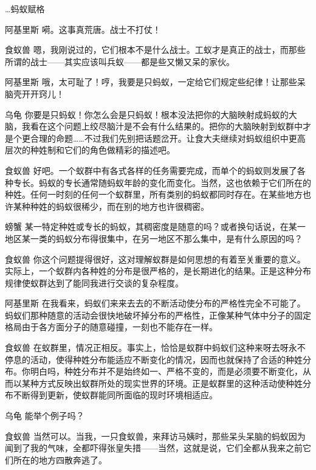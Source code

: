 \begin{dialog}{…蚂蚁赋格}
\begin{dialogue}
\item[阿基里斯]嗬。这事真荒唐。战士不打仗！

\item[食蚁兽]嗯，我刚说过的，它们根本不是什么战士。工蚁才是真正的战士，而那些所谓的战士——其实应该叫兵蚁——都是些又懒又呆的家伙。

\item[阿基里斯]哦，太可耻了！哼，我要是只蚂蚁，一定给它们规定些纪律！让那些呆脑壳开开窍儿！

\item[乌龟]你要是只蚂蚁！你怎么会是只蚂蚁！根本没法把你的大脑映射成蚂蚁的大脑，我看在这个问题上绞尽脑汁是不会有什么结果的。把你的大脑映射到蚁群中才是个更合理的命题……不过我们先别把话题岔开。让食大夫继续对蚂蚁组织中更高层次的种姓制和它们的角色做精彩的描述吧。

\item[食蚁兽]好吧。一个蚁群中有各式各样的任务需要完成，而单个的蚂蚁则发展了各种专长。蚂蚁的专长通常随蚂蚁年龄的变化而变化。当然，这也依赖于它们所在的种姓。任何一时刻的任何一个蚁群里，所有类别的蚂蚁都同时存在。在某些地方也许某种种姓的蚂蚁很稀少，而在别的地方也许很稠密。

\item[螃蟹]某一特定种姓或专长的蚂蚁，其稠密度是随意的吗？或者换句话说，在某一地区某一类的蚂蚁分布得很集中，在另一地区不那么集中，是有什么原因的吗？

\item[食蚁兽]你这个问题提得很好，这对理解蚁群是如何思想的有着至关重要的意义。实际上，一个蚁群内各种姓的分布是很严格的，是长期进化的结果。正是这种分布规律使蚁群达到了能同我进行交谈的复杂程度。

\item[阿基里斯]在我看来，蚂蚁们来来去去的不断活动使分布的严格性完全不可能了。蚂蚁们那种随意的活动会很快地破坏掉分布的严格性，正像某种气体中分子的固定格局由于各方面分子的随意碰撞，一刻也不能存在一样。

\item[食蚁兽]在蚁群里，情况正相反。事实上，恰恰是蚁群中蚂蚁们这种来呀去呀永不停息的活动，使得种姓分布能适应不断变化的情况，因而也就保持了合适的种姓分布。你明白吗，种姓分布并不是始终如一、严格不变的，而是必须要不断变化，从而以某种方式反映出蚁群所处的现实世界的环境。正是蚁群里的这种活动使种姓分布不断得到更新，使蚁群能同所面临的现时环境相适应。

\item[乌龟]能举个例子吗？

\item[食蚁兽]当然可以。当我，一只食蚁兽，来拜访马姨时，那些呆头呆脑的蚂蚁因为闻到了我的气味，全都吓得张皇失措——当然，这就是说，它们全都从我来之前它们所在的地方四散奔逃了。


\end{dialogue}
\end{dialog}

